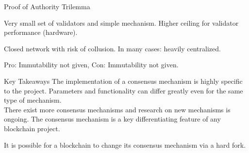 \documentclass[]{beamer}
\begin{document}
	\begin{frame}{Proof of Authority Trilemma}
		\begin{center}
			\begin{tikzpicture}[scale=0.6, every node/.style ={scale=0.8}]
				
			\end{tikzpicture}
		\end{center}
		
		\begin{description}[labelwidth=10em]
			\item[\textbf{Scalability}] Very small set of validators and simple mechanism. Higher ceiling for validator performance (hardware).
			\item[\textbf{Decentralization}] Closed network with risk of collusion. In many cases: heavily centralized. 
			\item[\textbf{Security}] Pro: Immutability not given, Con: Immutability not given.
		\end{description}
	\end{frame}
	
	\begin{frame}{Key Takeaways}
		The implementation of a consensus mechanism is highly specific to the project. Parameters and functionality can differ greatly even for the same type of mechanism. \\
		
		\pause
		\vspace{1.5em}
		There exist more consensus mechanisms and research on new mechanisms is ongoing. The consensus mechanism is a key differentiating feature of any blockchain project.
		
		\pause
		\vspace{1.5em}
		It is possible for a blockchain to change its consensus mechanism via a hard fork.		
	\end{frame}
	
	
	
\end{document}
